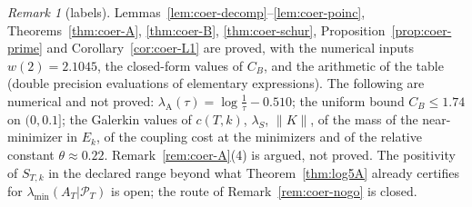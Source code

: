 \documentclass[11pt]{amsart}
\theoremstyle{definition}
\theoremstyle{remark}
\newtheorem{remark}[theorem]{Remark}
\newcommand{\PT}{\mathcal P_T}
\newcommand{\lamA}{\lambda_{\min}(A_T|\PT)}
\newcommand{\DraftStandalone}{}
\begin{document}

\begin{remark}[labels]\label{rem:coer-labels}
Lemmas~\ref{lem:coer-decomp}--\ref{lem:coer-poinc}, Theorems~\ref{thm:coer-A}, \ref{thm:coer-B}, \ref{thm:coer-schur},
Proposition~\ref{prop:coer-prime} and Corollary~\ref{cor:coer-L1} are proved, with the numerical inputs
$w(2)=2.1045$, the closed-form values of $C_B$, and the arithmetic of the table (double precision evaluations of
elementary expressions). The following are numerical and not proved: $\lambda_{\mathrm A}(\tau)=\log\frac1\tau-0.510$;
the uniform bound $C_B\le1.74$ on $(0,0.1]$; the Galerkin values of $c(T,k)$, $\lambda_S$, $\|K\|$, of the mass of the
near-minimizer in $E_k$, of the coupling cost at the minimizers and of the relative constant $\theta\approx0.22$.
Remark~\ref{rem:coer-A}(4) is argued, not proved. The positivity of $S_{T,k}$ in the declared range beyond what
Theorem~\ref{thm:log5A} already certifies for $\lamA$ is open; the route of Remark~\ref{rem:coer-nogo} is closed.
\end{remark}

\ifdefined\DraftStandalone
\end{document}
